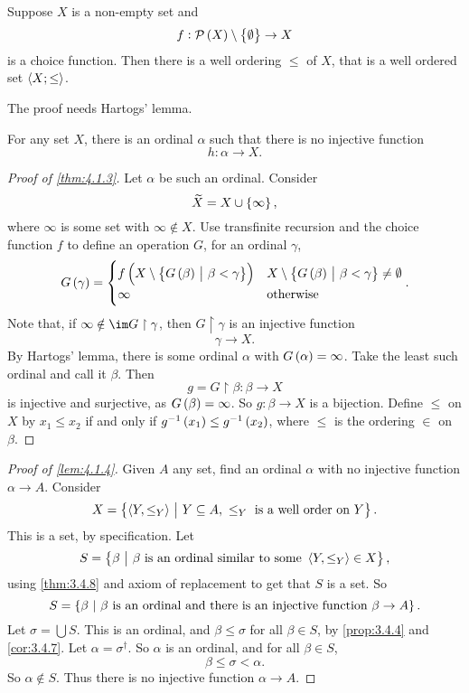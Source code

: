 \begin{theorem}
\label{thm:4.1.3}
Suppose $ X $ is a non-empty set and
$$ f : \PPP\br{X} \setminus \cbr{\emptyset} \to X $$
is a choice function. Then there is a well ordering $ \le $ of $ X $, that is a well ordered set $ \left\langle X; \le \right\rangle $.
\end{theorem}

The proof needs Hartogs' lemma.

\begin{lemma}
\label{lem:4.1.4}
For any set $ X $, there is an ordinal $ \alpha $ such that there is no injective function
$$ h : \alpha \to X. $$
\end{lemma}

\begin{proof}[Proof of \ref{thm:4.1.3}]
Let $ \alpha $ be such an ordinal. Consider
$$ \widetilde{X} = X \cup \cbr{\infty}, $$
where $ \infty $ is some set with $ \infty \notin X $. Use transfinite recursion and the choice function $ f $ to define an operation $ G $, for an ordinal $ \gamma $,
$$ G\br{\gamma} =
\begin{cases}
f\br{X \setminus \cbr{G\br{\beta} \st \beta < \gamma}} & X \setminus \cbr{G\br{\beta} \st \beta < \gamma} \ne \emptyset \\
\infty & \text{otherwise}
\end{cases}.
$$
Note that, if $ \infty \notin \im G \upharpoonright \gamma $, then $ G \upharpoonright \gamma $ is an injective function
$$ \gamma \to X. $$
By Hartogs' lemma, there is some ordinal $ \alpha $ with $ G\br{\alpha} = \infty $. Take the least such ordinal and call it $ \beta $. Then
$$ g = G \upharpoonright \beta : \beta \to X $$
is injective and surjective, as $ G\br{\beta} = \infty $. So $ g : \beta \to X $ is a bijection. Define $ \le $ on $ X $ by $ x_1 \le x_2 $ if and only if $ g^{-1}\br{x_1} \le g^{-1}\br{x_2} $, where $ \le $ is the ordering $ \in $ on $ \beta $.
\end{proof}

\pagebreak

\begin{proof}[Proof of \ref{lem:4.1.4}]
Given $ A $ any set, find an ordinal $ \alpha $ with no injective function $ \alpha \to A $. Consider
$$ X = \cbr{\abr{Y, \le_Y} \st Y \subseteq A, \ \le_Y \ \text{is a well order on} \ Y}. $$
This is a set, by specification. Let
$$ S = \cbr{\beta \st \beta \ \text{is an ordinal similar to some} \ \abr{Y, \le_Y} \in X}, $$
using \ref{thm:3.4.8} and axiom of replacement to get that $ S $ is a set. So
$$ S = \cbr{\beta \st \beta \ \text{is an ordinal and there is an injective function} \ \beta \to A}. $$
Let $ \sigma = \bigcup S $. This is an ordinal, and $ \beta \le \sigma $ for all $ \beta \in S $, by \ref{prop:3.4.4} and \ref{cor:3.4.7}. Let $ \alpha = \sigma^\dagger $. So $ \alpha $ is an ordinal, and for all $ \beta \in S $,
$$ \beta \le \sigma < \alpha. $$
So $ \alpha \notin S $. Thus there is no injective function $ \alpha \to A $.
\end{proof}

